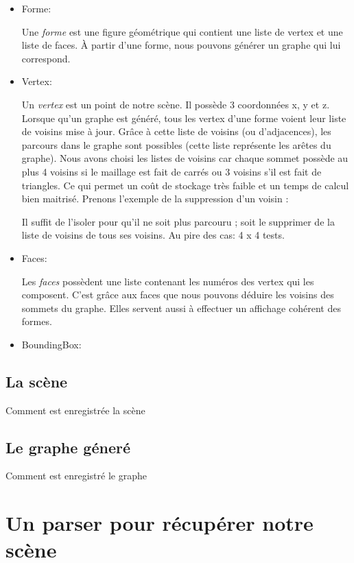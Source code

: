 \documentclass[a4paper,12pt]{report}
\begin{document}
\begin{itemize}
 \item Forme:

Une \textit{forme} est une figure géométrique qui contient une liste de vertex et une liste de faces. À partir d'une forme, nous pouvons générer un graphe qui lui correspond.
 
 \item Vertex:

Un \textit{vertex} est un point de notre scène. Il possède 3 coordonnées x, y et z. Lorsque qu'un graphe est généré, tous les vertex d'une forme voient leur liste de voisins mise à jour. Grâce à cette liste de voisins (ou d'adjacences), les parcours dans le graphe sont possibles (cette liste
représente les arêtes du graphe). Nous avons choisi les listes de voisins car chaque sommet possède au plus 4 voisins si le maillage est fait de carrés ou 3 voisins s'il est fait de triangles. Ce qui permet un coût de stockage très faible et un temps de calcul bien maitrisé. Prenons l'exemple de la suppression d'un voisin :

Il suffit de l'isoler pour qu'il ne soit plus parcouru ; soit le supprimer de la liste de voisins de tous ses voisins. Au pire des cas: 4 x 4 tests.
 
 \item Faces:

Les \textit{faces} possèdent une liste contenant les numéros des vertex qui les composent. C'est grâce aux faces que nous pouvons déduire les voisins des sommets du graphe. Elles servent aussi à effectuer un affichage cohérent des formes.

  \item BoundingBox:

\end{itemize}


\subsection{La scène}
Comment est enregistrée la scène
\subsection{Le graphe géneré}
Comment est enregistré le graphe

\section{Un parser pour récupérer notre scène}
\end{document}
